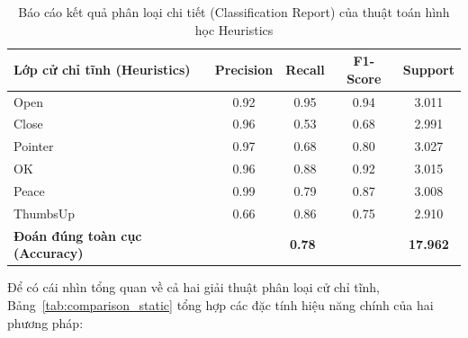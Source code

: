 \documentclass[../BTL.tex]{subfiles}
\begin{document}
\begin{table}[H]
\centering
\begin{tabular}{|l|c|c|c|c|}
\hline
\textbf{Lớp cử chỉ tĩnh (Heuristics)} & \textbf{Precision} & \textbf{Recall} & \textbf{F1-Score} & \textbf{Support} \\ \hline
Open & 0.92 & 0.95 & 0.94 & 3.011 \\ \hline
Close & 0.96 & 0.53 & 0.68 & 2.991 \\ \hline
Pointer & 0.97 & 0.68 & 0.80 & 3.027 \\ \hline
OK & 0.96 & 0.88 & 0.92 & 3.015 \\ \hline
Peace & 0.99 & 0.79 & 0.87 & 3.008 \\ \hline
ThumbsUp & 0.66 & 0.86 & 0.75 & 2.910 \\ \hline
\textbf{Đoán đúng toàn cục (Accuracy)} & \multicolumn{3}{c|}{\textbf{0.78}} & \textbf{17.962} \\ \hline
\end{tabular}
\caption{Báo cáo kết quả phân loại chi tiết (Classification Report) của thuật toán hình học Heuristics}
\label{tab:static_heuristics_report}
\end{table}

Để có cái nhìn tổng quan về cả hai giải thuật phân loại cử chỉ tĩnh, Bảng~\ref{tab:comparison_static} tổng hợp các đặc tính hiệu năng chính của hai phương pháp:

\begin{table}[H]
\centering
{}
\caption{Bảng so sánh hiệu năng giữa mô hình học máy MLP và thuật toán hình học Heuristics}
\label{tab:comparison_static}
\end{table}
\end{document}

